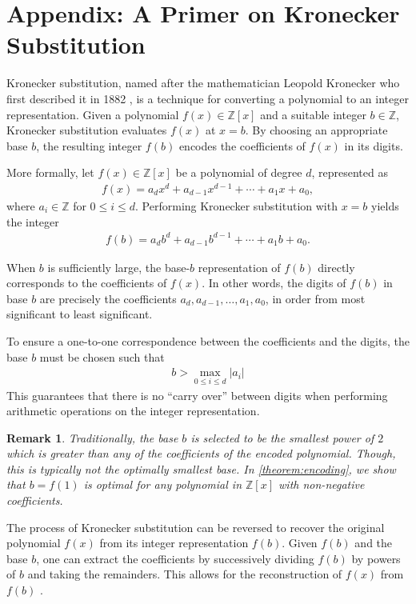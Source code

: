 \documentclass[11pt,reqno]{article}
\theoremstyle{plain}
\newtheorem{remark}{Remark}
\theoremstyle{definition}
\begin{document}
\section{Appendix: A Primer on Kronecker Substitution} \label{section:kronecker}
Kronecker substitution, named after the mathematician Leopold Kronecker who first described it in 1882 \cite{kronecker1882}, is a technique for converting a polynomial to an integer representation. Given a polynomial $f(x) \in \mathbb{Z}[x]$ and a suitable integer $b \in \mathbb{Z}$, Kronecker substitution evaluates $f(x)$ at $x = b$. By choosing an appropriate base $b$, the resulting integer $f(b)$ encodes the coefficients of $f(x)$ in its digits.

More formally, let $f(x) \in \mathbb{Z}[x]$ be a polynomial of degree $d$, represented as
\begin{align*}
f(x) = a_d x^d + a_{d-1} x^{d-1} + \cdots + a_1 x + a_0,
\end{align*}
where $a_i \in \mathbb{Z}$ for $0 \leq i \leq d$. Performing Kronecker substitution with $x = b$ yields the integer
\begin{align*}
f(b) = a_d b^d + a_{d-1} b^{d-1} + \cdots + a_1 b + a_0.
\end{align*}

When $b$ is sufficiently large, the base-$b$ representation of $f(b)$ directly corresponds to the coefficients of $f(x)$. In other words, the digits of $f(b)$ in base $b$ are precisely the coefficients $a_d, a_{d-1}, \ldots, a_1, a_0$, in order from most significant to least significant.

To ensure a one-to-one correspondence between the coefficients and the digits, the base $b$ must be chosen such that
\begin{align*}
    b > \max_{0 \leq i \leq d} |a_i|
\end{align*}
This guarantees that there is no ``carry over'' between digits when performing arithmetic operations on the integer representation.

\begin{remark}
Traditionally, the base $b$ is selected to be the smallest power of $2$ which is greater than any of the coefficients of the encoded polynomial. Though, this is typically not the optimally smallest base. In \cref{theorem:encoding}, we show that $b=f(1)$ is optimal for any polynomial in $\mathbb{Z}[x]$ with non-negative coefficients.
\end{remark}

The process of Kronecker substitution can be reversed to recover the original polynomial $f(x)$ from its integer representation $f(b)$. Given $f(b)$ and the base $b$, one can extract the coefficients by successively dividing $f(b)$ by powers of $b$ and taking the remainders. This allows for the reconstruction of $f(x)$ from $f(b)$ \cite{grimaldi2004discrete}.
\end{document}
